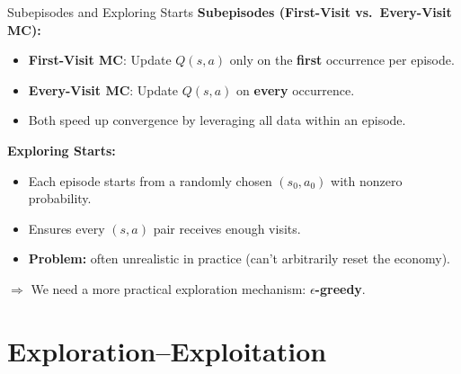 \documentclass[10pt,english,aspectratio=169]{beamer}
\begin{document}
\begin{frame}{Subepisodes and Exploring Starts}
\textbf{Subepisodes (First-Visit vs.\ Every-Visit MC):}
\begin{itemize}
    \item \textbf{First-Visit MC}: Update $Q(s,a)$ only on the \textbf{first} occurrence per episode.
    \item \textbf{Every-Visit MC}: Update $Q(s,a)$ on \textbf{every} occurrence.
    \item Both speed up convergence by leveraging all data within an episode.
\end{itemize}

\vspace{0.3cm}
\textbf{Exploring Starts:}
\begin{itemize}
    \item Each episode starts from a randomly chosen $(s_0, a_0)$ with nonzero probability.
    \item Ensures every $(s,a)$ pair receives enough visits.
    \item \textbf{Problem:} often unrealistic in practice (can't arbitrarily reset the economy).
\end{itemize}

\vspace{0.3cm}
$\Rightarrow$ We need a more practical exploration mechanism: \textbf{$\epsilon$-greedy}.
\end{frame}


\section{Exploration--Exploitation}
\end{document}
